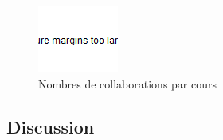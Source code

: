 \documentclass[9pt,twocolumn,twoside,]{pnas-new}
\begin{document}
\begin{figure}
  \centering
  \includegraphics[width=\linewidth]{sigle.png}
  \caption{Nombres de collaborations par cours}
  \label{fig:sigle}
\end{figure}

\hypertarget{Discussion}{%
\subsection*{Discussion}\label{Discussion}}
\end{document}
